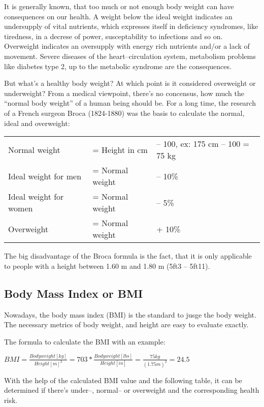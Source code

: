 \documentclass[../main.tex]{subfiles}
\begin{document}
It is generally known, that too much or not enough body weight can have consequences on our health.
A weight below the ideal weight indicates an undersupply of vital nutrients, which expresses itself in deficiency syndromes,
like tiredness, in a decrese of power, susceptability to infections and so on.
Overweight indicates an oversupply with energy rich nutrients and/or a lack of movement.
Severe diseases of the heart--circulation system, metabolism problems like diabetes type 2, up to the metabolic syndrome are the consequences.

But what's a healthy body weight? At which point is it considered overweight or underweight?
From a medical viewpoint, there's no concensus, how much the ``normal body weight'' of a human being should be.
For  a long time, the research of a French surgeon Broca (1824-1880) was the basis to calculate the normal, ideal and overweight:

\noindent
\begin{tabular}{lll}
  Normal weight & = Height in cm &-- 100, ex: 175 cm -- 100 = 75 kg \\
  Ideal weight for men & = Normal weight &-- 10\% \\
  Ideal weight for women & = Normal weight &-- 5\% \\
  Overweight & = Normal weight &+ 10\% \\
\end{tabular}

The big disadvantage of the Broca formula is the fact, that it is only applicable to people with a height between 1.60 m and 1.80 m (5ft3 -- 5ft11).

\subsection{Body Mass Index or BMI}

Nowadays, the body mass index (BMI) is the standard to jusge the body weight.
The necessary metrics of body weight, and height are easy to evaluate exactly.

The formula to calculate the BMI with an example:

\vspace{2mm}
\begin{center}
  $BMI = \frac{Body weight [kg]}{Height [m]^2} = 703 * \frac{Body weight [lbs]}{Height [in]}
  = \frac{75 kg}{(1.75 m)^2} = 24.5$
\end{center}

With the help of the calculated BMI value and the following table, it can be determined if there's under--, normal-- or overweight and the corresponding health risk.
\end{document}
